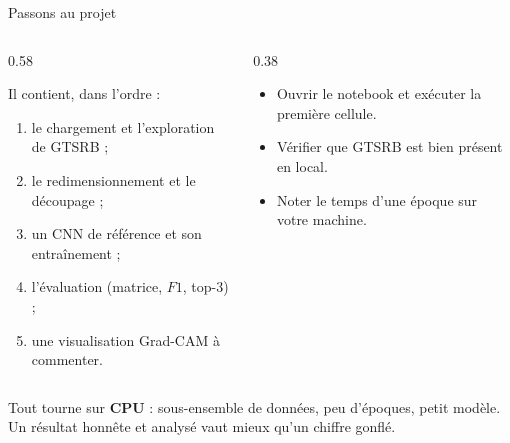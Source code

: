 \begin{frame}{Passons au projet}
\begin{columns}[t]
\begin{column}{0.58\textwidth}
\begin{abox}
\medskip

Il contient, dans l'ordre :
\begin{enumerate}
  \item le chargement et l'exploration de GTSRB ;
  \item le redimensionnement et le découpage ;
  \item un CNN de référence et son entraînement ;
  \item l'évaluation (matrice, $F1$, top-3) ;
  \item une visualisation Grad-CAM à commenter.
\end{enumerate}
\end{abox}
\end{column}
\begin{column}{0.38\textwidth}
\begin{kbox}
\begin{itemize}
  \item Ouvrir le notebook et exécuter la première cellule.
  \item Vérifier que GTSRB est bien présent en local.
  \item Noter le temps d'une époque sur votre machine.
\end{itemize}
\end{kbox}
\end{column}
\end{columns}
\vspace{1mm}
\begin{wbox}[Rappel]
Tout tourne sur \textbf{CPU} : sous-ensemble de données, peu d'époques, petit
modèle. Un résultat honnête et analysé vaut mieux qu'un chiffre gonflé.
\end{wbox}
\end{frame}
